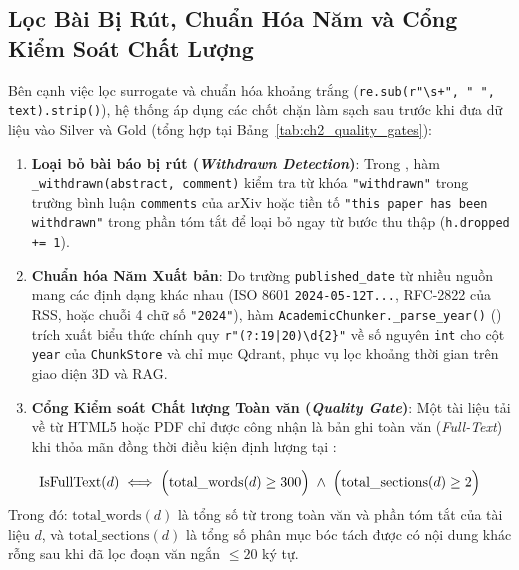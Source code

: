 \subsection{Lọc Bài Bị Rút, Chuẩn Hóa Năm và Cổng Kiểm Soát Chất Lượng}
\label{sec:ch2_quality_gates}

Bên cạnh việc lọc surrogate và chuẩn hóa khoảng trắng (\texttt{re.sub(r"\textbackslash s+", " ", text).strip()}), hệ thống áp dụng các chốt chặn làm sạch sau trước khi đưa dữ liệu vào Silver và Gold (tổng hợp tại Bảng~\ref{tab:ch2_quality_gates}):
\begin{enumerate}[label=\textbf{\arabic*.}]
  \item \textbf{Loại bỏ bài báo bị rút (\textit{Withdrawn Detection})}: Trong , hàm \texttt{\_withdrawn(abstract, comment)} kiểm tra từ khóa \texttt{"withdrawn"} trong trường bình luận \texttt{comments} của arXiv hoặc tiền tố \texttt{"this paper has been withdrawn"} trong phần tóm tắt để loại bỏ ngay từ bước thu thập (\texttt{h.dropped += 1}).
  \item \textbf{Chuẩn hóa Năm Xuất bản}: Do trường \texttt{published\_date} từ nhiều nguồn mang các định dạng khác nhau (ISO 8601 \texttt{2024-05-12T...}, RFC-2822 của RSS, hoặc chuỗi 4 chữ số \texttt{"2024"}), hàm \texttt{AcademicChunker.\_parse\_year()} () trích xuất biểu thức chính quy \texttt{r"(?:19|20)\textbackslash d\{2\}"} về số nguyên \texttt{int} cho cột \texttt{year} của \texttt{ChunkStore} và chỉ mục Qdrant, phục vụ lọc khoảng thời gian trên giao diện 3D và RAG.
  \item \textbf{Cổng Kiểm soát Chất lượng Toàn văn (\textit{Quality Gate})}: Một tài liệu tải về từ HTML5 hoặc PDF chỉ được công nhận là bản ghi toàn văn (\textit{Full-Text}) khi thỏa mãn đồng thời điều kiện định lượng tại :
\end{enumerate}
\begin{equation}
  \operatorname{IsFullText}(d) \iff \Bigl(\text{total\_words}(d) \ge 300\Bigr) \;\land\; \Bigl(\text{total\_sections}(d) \ge 2\Bigr)
  \label{eq:ch2_quality_gate}
\end{equation}
\noindent Trong đó: $\text{total\_words}(d)$ là tổng số từ trong toàn văn và phần tóm tắt của tài liệu $d$, và $\text{total\_sections}(d)$ là tổng số phân mục bóc tách được có nội dung khác rỗng sau khi đã lọc đoạn văn ngắn $\le 20$ ký tự.

